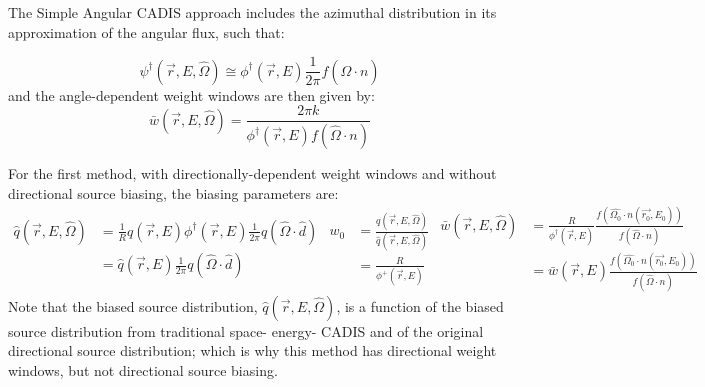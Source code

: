 The Simple Angular CADIS approach includes the azimuthal distribution in its
approximation
of the angular flux, such that:

\begin{equation}
\psi^{\dagger}(\vec{r}, E, \hat \Omega) \cong \phi^{\dagger}(\vec{r}, E)
\frac{1}{2\pi} f(\hat\Omega \cdot n)
\label{eq:AvAngflux}
\end{equation}
and the angle-dependent weight windows are then given by:
\begin{equation}
\bar {w} (\vec{r},E,\hat\Omega) = \frac{2 \pi k}{\phi^{\dagger}(\vec{r},E)
                                  f(\hat\Omega \cdot n)}
\end{equation}

For the first method, with directionally-dependent weight windows and without
directional
source biasing, the biasing parameters are:
\begin{subequations}
\label{SA-CADIS1}
\begin{equation}
\begin{split}
\hat{q}(\vec{r},E,\hat\Omega) & = \frac{1}{R} q(\vec{r},E) \phi^{\dagger}
                                  (\vec{r},E) \frac{1}{2 \pi} q(\hat\Omega \cdot
                                  \hat d)\\
                              & = \hat{q}(\vec{r},E) \frac{1}{2 \pi}
                              q(\hat\Omega \cdot \hat d)
\end{split}
\end{equation}
\begin{equation}
\begin{split}
w_0  & = \frac{q(\vec{r},E,\hat\Omega)}{\hat{q}(\vec{r},E,\hat\Omega)} \\
     & = \frac{R}{\phi^{+}(\vec {r} ,E)}
\end{split}
\end{equation}
\begin{equation}
\begin{split}
\bar{w} (\vec{r},E,\hat\Omega)  & = \frac{R}{\phi^{\dagger}(\vec{r},E)}
                                    \frac{f(\hat{\Omega_0}\cdot n(\vec{r_0}, E_0))}
                                    {f(\hat\Omega \cdot n)} \\
                                & = \bar{w}(\vec{r},E) \frac{f(\hat{\Omega_0}\cdot
                                    n(\vec{r_0}, E_0))}{f(\hat\Omega \cdot n)}
\end{split}
\end{equation}
\end{subequations}
Note that the biased source distribution, $\hat{q}(\vec{r},E,\hat\Omega)$, is a
function of
the biased source distribution from traditional space- energy- CADIS and of the
original
directional source distribution; which is why this method has directional weight
windows,
but not directional source biasing.


